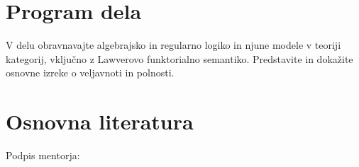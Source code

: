 \documentclass[../kategoricna_logika.tex]{subfiles}
\begin{document}
\section*{Program dela}
V delu obravnavajte algebrajsko in regularno logiko in njune modele v teoriji kategorij,
vključno z Lawverovo funktorialno semantiko.
Predstavite in dokažite osnovne izreke o veljavnoti in polnosti.

\section*{Osnovna literatura}

\begin{itemize}
\end{itemize}

\vspace{2cm}
\hspace*{\fill} Podpis mentorja: \phantom{prostor za podpis}

\cleardoublepage
{}
\end{document}
